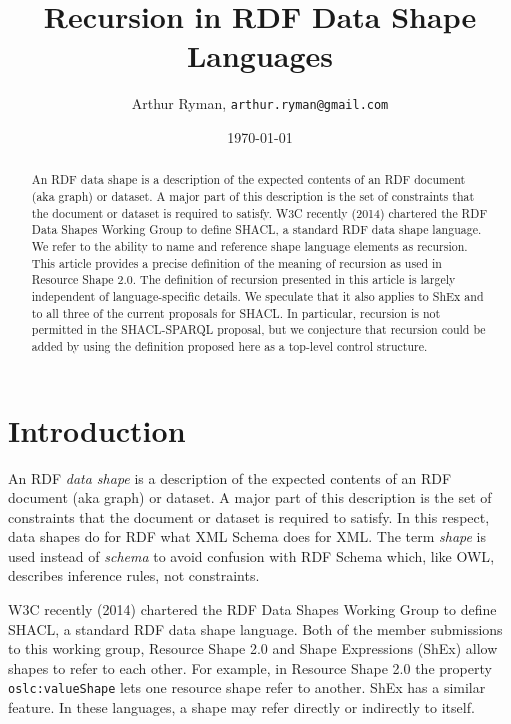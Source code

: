 \documentclass{article}
\title{Recursion in RDF Data Shape Languages}
\author{Arthur Ryman, {\tt arthur.ryman@gmail.com}}
\date{\today}
\begin{document}


\maketitle

\begin{abstract}
An RDF data shape is a description of the expected contents of an RDF document (aka graph) or dataset.
A major part of this description is the set of constraints that the document or dataset is required to satisfy.
W3C recently (2014) chartered the RDF Data Shapes Working Group to define SHACL, a standard RDF data shape language.
We refer to the ability to name and reference shape language elements as recursion.
This article provides a precise definition of the meaning of recursion as used in Resource Shape 2.0.
The definition of recursion presented in this article is largely independent of language-specific details.
We speculate that it also applies to ShEx and to all three of the current proposals for SHACL.
In particular, recursion is not permitted in the SHACL-SPARQL proposal, but we conjecture
that recursion could be added by using the definition proposed here as a top-level control structure.
\end{abstract}

\section{Introduction}
\label{sec-intro}
An RDF {\em data shape} is a description of the expected contents of an RDF document (aka graph) or dataset.
A major part of this description is the set of constraints that the document or dataset is required to satisfy.
In this respect, data shapes do for RDF what XML Schema\cite{w3c:xsd11} does for XML.
The term {\em shape} is used instead of {\em schema} to avoid confusion with RDF Schema\cite{w3c:rdfs11} which, like OWL\cite{w3c:owl2},
describes inference rules, not constraints.

W3C recently (2014) chartered the RDF Data Shapes Working Group to define SHACL, a standard RDF data shape language\cite{w3c:shapeswg}.
Both of the member submissions to this working group, Resource Shape 2.0\cite{arthur:rs} and 
Shape Expressions (ShEx) \cite{harold:shex-def} allow shapes to refer to each other.
For example, in Resource Shape 2.0 the property {\tt oslc:valueShape} lets one resource shape refer to another.
ShEx has a similar feature. In these languages, a shape may refer directly or indirectly to itself.
\end{document}
